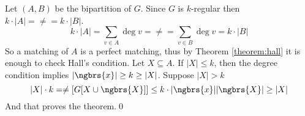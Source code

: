 \begin{prf}
    Let $(A, B)$ be the bipartition of $G$. Since $G$ is $k$-regular then $k \cdot |A| = \ne = k \cdot |B|$.
    \begin{equation*}
        k \cdot |A| = \sum_{v \in A}\deg{v} = \ne = \sum_{v \in B}\deg{v} = k \cdot |B|
    \end{equation*}
    So a matching of $A$ is a perfect matching, thus by Theorem \ref{theorem:hall} it is enough to check Hall's condition. Let $X \subseteq A$. If $|X| \leq k$, then the degree condition implies $|\ngbrs{x}| \geq k \geq |X|$. Suppose $|X| > k$
    \begin{equation*}
        |X| \cdot k = \ne[G[X \cup \ngbrs{X}]] \leq k \cdot |\ngbrs{x}|\\
        |\ngbrs{X}| \geq |X|
    \end{equation*}
    And that proves the theorem.\qed
\end{prf}